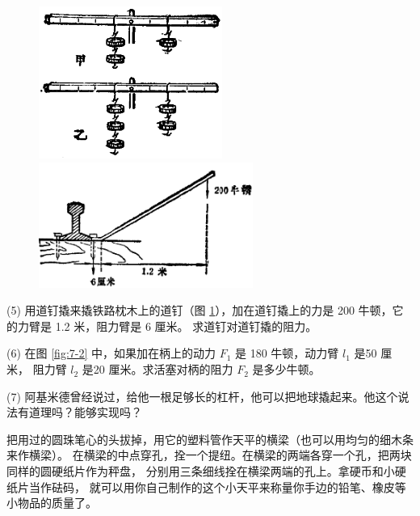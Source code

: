 \begin{figure}[htbp]
    \centering
    \begin{minipage}{7cm}
    \centering
    \includegraphics[width=6cm]{../pic/czwl1-ch7-13}
    \caption{}\label{fig:7-13}
    \end{minipage}
    \qquad
    \begin{minipage}{7cm}
    \centering
    \includegraphics[width=7cm]{../pic/czwl1-ch7-14}
    \caption{}\label{fig:7-14}
    \end{minipage}
\end{figure}


(5) 用道钉撬来撬铁路枕木上的道钉（图 \ref{fig:7-14}），加在道钉撬上的力是 200 牛顿，它的力臂是 1.2 米，阻力臂是 6 厘米。
求道钉对道钉撬的阻力。

(6) 在图 \ref{fig:7-2} 中，如果加在柄上的动力 $F_1$ 是 180 牛顿，动力臂 $l_1$ 是50 厘米，
阻力臂 $l_2$ 是20 厘米。求活塞对柄的阻力 $F_2$ 是多少牛顿。

(7) 阿基米德曾经说过，给他一根足够长的杠杆，他可以把地球撬起来。他这个说法有道理吗？能够实现吗？




把用过的圆珠笔心的头拔掉，用它的塑料管作天平的横梁（也可以用均匀的细木条来作横梁）。
在横梁的中点穿孔，拴一个提纽。在横梁的两端各穿一个孔，把两块同样的圆硬纸片作为秤盘，
分别用三条细线拴在横梁两端的孔上。拿硬币和小硬纸片当作砝码，
就可以用你自己制作的这个小天平来称量你手边的铅笔、橡皮等小物品的质量了。


